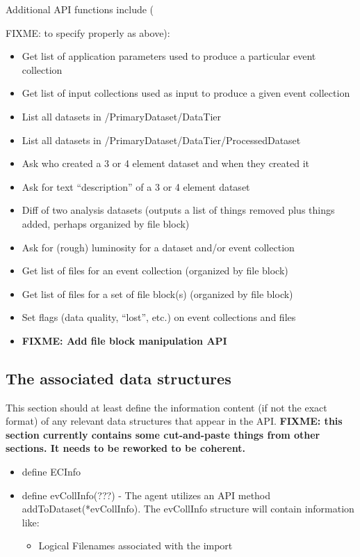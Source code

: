 \documentclass[pdftex]{cmspaper}
\begin{document}
Additional API functions include ({FIXME: to specify properly as above):
\begin{itemize}
\item Get list of application parameters used to produce a particular event
      collection
\item Get list of input collections used as input to produce a given event
      collection
\item List all datasets in /PrimaryDataset/DataTier
\item List all datasets in /PrimaryDataset/DataTier/ProcessedDataset
\item Ask who created a 3 or 4 element dataset and when they created it
\item Ask for text ``description'' of a 3 or 4 element dataset
\item Diff of two analysis datasets (outputs a list of things removed plus
      things added, perhaps organized by file block)
\item Ask for (rough) luminosity for a dataset and/or event collection
\item Get list of files for an event collection (organized by file block)
\item Get list of files for a set of file block(s) (organized by file block)
\item Set flags (data quality, ``lost'', etc.) on event collections and files
\item {\bf FIXME: Add file block manipulation API}
\end{itemize}

\subsection{The associated data structures}

  This section should at least define the information content (if not
the exact format) of any relevant data structures that appear in the API.
{\bf FIXME: this section currently contains some cut-and-paste things
from other sections. It needs to be reworked to be coherent.}

\begin{itemize}
\item define ECInfo
\item define evCollInfo(???) - The agent utilizes an API method 
      addToDataset(*evCollInfo). The evCollInfo structure will contain 
      information like: 

  \begin{itemize}
  \item Logical Filenames associated with the import


\end{itemize}
\end{itemize}}
\end{document}
